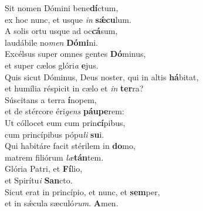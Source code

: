 \evenverse Sit nomen Dómini bene\textbf{dí}ctum,~\*\\
\evenverse ex hoc nunc, et usque \textit{in} \textbf{sǽ}\textbf{cu}lum.\\
\oddverse A solis ortu usque ad oc\textbf{cá}sum,~\*\\
\oddverse laudábile no\textit{men} \textbf{Dó}\textbf{mi}ni.\\
\evenverse Excélsus super omnes gentes \textbf{Dó}minus,~\*\\
\evenverse et super cælos glóri\textit{a} \textbf{e}jus.\\
\oddverse Quis sicut Dóminus, Deus noster, qui in altis \textbf{há}bitat,~\*\\
\oddverse et humília réspicit in cælo et \textit{in} \textbf{ter}ra?\\
\evenverse Súscitans a terra \textbf{í}nopem,~\*\\
\evenverse et de stércore éri\textit{gens} \textbf{páu}\textbf{pe}rem:\\
\oddverse Ut cóllocet eum cum prin\textbf{cí}pibus,~\*\\
\oddverse cum princípibus pópu\textit{li} \textbf{su}i.\\
\evenverse Qui habitáre facit stérilem in \textbf{do}mo,~\*\\
\evenverse matrem filiórum \textit{læ}\textbf{tán}tem.\\
\oddverse Glória Patri, et \textbf{Fí}lio,~\*\\
\oddverse et Spirítu\textit{i} \textbf{San}cto.\\
\evenverse Sicut erat in princípio, et nunc, et \textbf{sem}per,~\*\\
\evenverse et in sǽcula sæculó\textit{rum}. \textbf{A}men.\\
